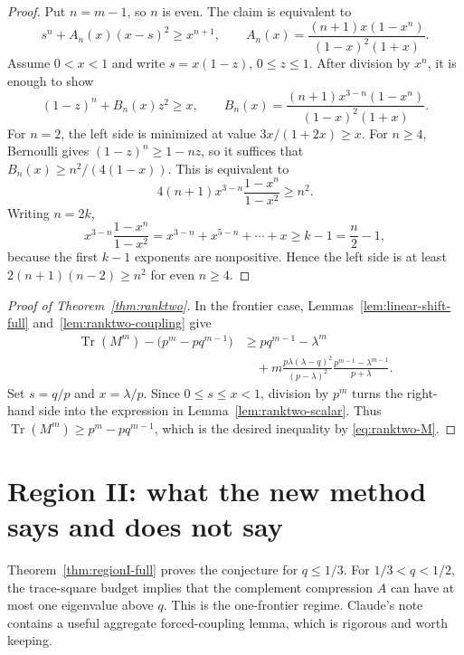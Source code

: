\documentclass[11pt]{article}
\newcommand{\Tr}{\operatorname{Tr}}
\begin{document}
\begin{proof}
Put $n=m-1$, so $n$ is even.  The claim is equivalent to
\[
        s^n+A_n(x)(x-s)^2\ge x^{n+1},
        \qquad
        A_n(x)=\frac{(n+1)x(1-x^n)}{(1-x)^2(1+x)}.
\]
Assume $0<x<1$ and write $s=x(1-z)$, $0\le z\le1$.  After division by $x^n$, it is enough to show
\[
        (1-z)^n+B_n(x)z^2\ge x,
        \qquad
        B_n(x)=\frac{(n+1)x^{3-n}(1-x^n)}{(1-x)^2(1+x)}.
\]
For $n=2$, the left side is minimized at value $3x/(1+2x)\ge x$.  For $n\ge4$, Bernoulli gives $(1-z)^n\ge1-nz$, so it suffices that $B_n(x)\ge n^2/(4(1-x))$.  This is equivalent to
\[
        4(n+1)x^{3-n}\frac{1-x^n}{1-x^2}\ge n^2.
\]
Writing $n=2k$,
\[
        x^{3-n}\frac{1-x^n}{1-x^2}
        =x^{3-n}+x^{5-n}+\cdots+x
        \ge k-1=\frac n2-1,
\]
because the first $k-1$ exponents are nonpositive.  Hence the left side is at least $2(n+1)(n-2)\ge n^2$ for even $n\ge4$.
\end{proof}

\begin{proof}[Proof of Theorem~\ref{thm:ranktwo}]
In the frontier case, Lemmas~\ref{lem:linear-shift-full} and~\ref{lem:ranktwo-coupling} give
\[
\begin{aligned}
\Tr(M^m)-\bigl(p^m-pq^{m-1}\bigr)
&\ge pq^{m-1}-\lambda^m \\
&\quad +m\frac{p\lambda(\lambda-q)^2}{(p-\lambda)^2}
      \frac{p^{m-1}-\lambda^{m-1}}{p+\lambda}.
\end{aligned}
\]
Set $s=q/p$ and $x=\lambda/p$.  Since $0\le s\le x<1$, division by $p^m$ turns the right-hand side into the expression in Lemma~\ref{lem:ranktwo-scalar}.  Thus $\Tr(M^m)\ge p^m-pq^{m-1}$, which is the desired inequality by \eqref{eq:ranktwo-M}.
\end{proof}

\section{Region II: what the new method says and does not say}\label{sec:regionII}

Theorem~\ref{thm:regionI-full} proves the conjecture for $q\le1/3$.  For $1/3<q<1/2$, the trace-square budget implies that the complement compression $A$ can have at most one eigenvalue above $q$.  This is the one-frontier regime.  Claude's note contains a useful aggregate forced-coupling lemma, which is rigorous and worth keeping.
\end{document}
